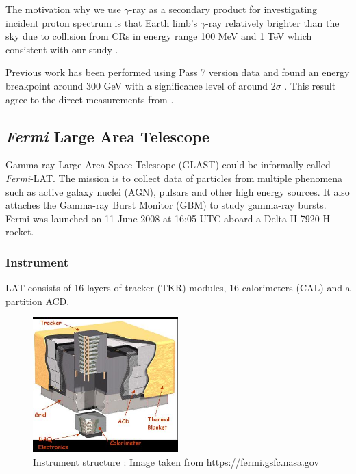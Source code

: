 \par The motivation why we use $\gamma$-ray as a secondary product for investigating incident proton spectrum is that Earth limb's $\gamma$-ray relatively brighter than the sky due to collision from CRs in energy range 100 MeV and 1 TeV which consistent with our study \cite{Warit2009}.

\par Previous work has been performed using Pass 7 version data \cite{FermiPass7} and found an energy breakpoint around 300 GeV with a significance level of around 2$\sigma$ \cite{previouswork}. This result agree to the direct measurements from \cite{AMS-02,PAMELA}.


\subsection{\textit{Fermi} Large Area Telescope}

Gamma-ray Large Area Space Telescope (GLAST) could be informally called \textit{Fermi}-LAT. The mission is to collect data of particles from multiple phenomena such as active galaxy nuclei (AGN), pulsars and other high energy sources.
It also attaches the Gamma-ray Burst Monitor (GBM) to study gamma-ray bursts. Fermi was launched on 11 June 2008 at 16:05 UTC aboard a Delta II 7920-H rocket.


\subsubsection*{Instrument}
LAT consists of 16 layers of tracker (TKR) modules, 16 calorimeters (CAL) and a partition ACD. 

\begin{figure}[h!]
  \centering
    \includegraphics[width=0.5\textwidth]{img/LATStructure}
    \caption{Instrument structure : Image taken from https://fermi.gsfc.nasa.gov}
\end{figure}

